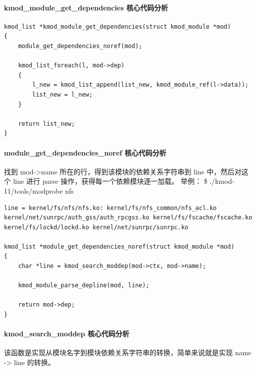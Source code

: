 \documentclass[11pt,a4paper]{article}
\begin{document}
\paragraph{kmod\_module\_get\_dependencies 核心代码分析}

{\begin{shaded}\begin{verbatim}
kmod_list *kmod_module_get_dependencies(struct kmod_module *mod)
{
    module_get_dependencies_noref(mod);

    kmod_list_foreach(l, mod->dep)
    {
        l_new = kmod_list_append(list_new, kmod_module_ref(l->data));
        list_new = l_new;
    }

    return list_new;
}
\end{verbatim}\end{shaded}}
\paragraph{module\_get\_dependencies\_noref 核心代码分析}

找到 mod-\textgreater{}name 所在的行，得到该模块的依赖关系字符串到 line
中，然后对这个 line 进行 parse 操作，获得每一个依赖模块逐一加载。 举例： \$
./kmod-11/tools/modprobe nfs

{\begin{shaded}\begin{verbatim}
line = kernel/fs/nfs/nfs.ko: kernel/fs/nfs_common/nfs_acl.ko kernel/net/sunrpc/auth_gss/auth_rpcgss.ko kernel/fs/fscache/fscache.ko kernel/fs/lockd/lockd.ko kernel/net/sunrpc/sunrpc.ko

kmod_list *module_get_dependencies_noref(struct kmod_module *mod)
{
    char *line = kmod_search_moddep(mod->ctx, mod->name);

    kmod_module_parse_depline(mod, line);

    return mod->dep;
}
\end{verbatim}\end{shaded}}
\paragraph{kmod\_search\_moddep 核心代码分析}

该函数是实现从模块名字到模块依赖关系字符串的转换，简单来说就是实现 name
-\textgreater{} line 的转换。
\end{document}
